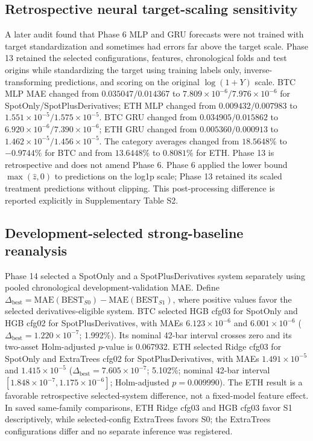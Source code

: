 \subsection{Retrospective neural target-scaling sensitivity}
A later audit found that Phase 6 MLP and GRU forecasts were not trained with target standardization and sometimes had errors far above the target scale. Phase 13 retained the selected configurations, features, chronological folds and test origins while standardizing the target using training labels only, inverse-transforming predictions, and scoring on the original $\log(1+Y)$ scale. BTC MLP MAE changed from $0.035047/0.014367$ to $7.809\times10^{-6}/7.976\times10^{-6}$ for SpotOnly/SpotPlusDerivatives; ETH MLP changed from $0.009432/0.007983$ to $1.551\times10^{-5}/1.575\times10^{-5}$. BTC GRU changed from $0.034905/0.015862$ to $6.920\times10^{-6}/7.390\times10^{-6}$; ETH GRU changed from $0.005360/0.000913$ to $1.462\times10^{-5}/1.456\times10^{-5}$. The category averages changed from $18.5648\%$ to $-0.9744\%$ for BTC and from $13.6448\%$ to $0.8081\%$ for ETH. Phase 13 is retrospective and does not amend Phase 6. Phase 6 applied the lower bound $\max(\hat z,0)$ to predictions on the log1p scale; Phase 13 retained its scaled treatment predictions without clipping. This post-processing difference is reported explicitly in Supplementary Table S2.

\subsection{Development-selected strong-baseline reanalysis}
Phase 14 selected a SpotOnly and a SpotPlusDerivatives system separately using pooled chronological development-validation MAE. Define $\Delta_{\mathrm{best}}=\mathrm{MAE}(\mathrm{BEST}_{S0})-\mathrm{MAE}(\mathrm{BEST}_{S1})$, where positive values favor the selected derivatives-eligible system. BTC selected HGB cfg03 for SpotOnly and HGB cfg02 for SpotPlusDerivatives, with MAEs $6.123\times10^{-6}$ and $6.001\times10^{-6}$ ($\Delta_{\mathrm{best}}=1.220\times10^{-7}$; 1.992\%). Its nominal 42-bar interval crosses zero and its two-asset Holm-adjusted $p$-value is 0.067932. ETH selected Ridge cfg03 for SpotOnly and ExtraTrees cfg02 for SpotPlusDerivatives, with MAEs $1.491\times10^{-5}$ and $1.415\times10^{-5}$ ($\Delta_{\mathrm{best}}=7.605\times10^{-7}$; 5.102\%; nominal 42-bar interval $[1.848\times10^{-7},1.175\times10^{-6}]$; Holm-adjusted $p=0.009990$). The ETH result is a favorable retrospective selected-system difference, not a fixed-model feature effect. In saved same-family comparisons, ETH Ridge cfg03 and HGB cfg03 favor S1 descriptively, while selected-config ExtraTrees favors S0; the ExtraTrees configurations differ and no separate inference was registered.

